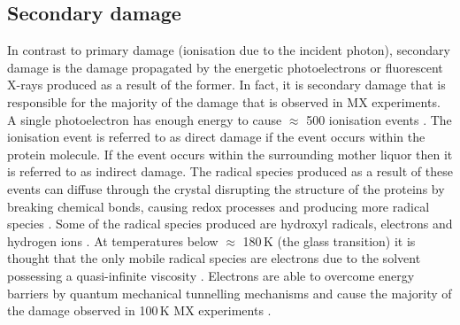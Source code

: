     \subsection{Secondary damage}
    \label{sub:Secondary damage}
        In contrast to primary damage (ionisation due to the incident photon), secondary damage is the damage propagated by the energetic photoelectrons or fluorescent X-rays produced as a result of the former.
        In fact, it is secondary damage that is responsible for the majority of the damage that is observed in MX experiments.
        A single photoelectron has enough energy to cause $\approx$ 500 ionisation events \cite{o2002physical}. The ionisation event is referred to as direct damage if the event occurs within the protein molecule.
        If the event occurs within the surrounding mother liquor then it is referred to as indirect damage.
        The radical species produced as a result of these events can diffuse through the crystal disrupting the structure of the proteins by breaking chemical bonds, causing redox processes and producing more radical species \cite{meents2010}.
		Some of the radical species produced are hydroxyl radicals, electrons and hydrogen ions \cite{garman2010}.
        At temperatures below $\approx$ 180\,K (the glass transition) it is thought that the only mobile radical species are electrons \cite{jones1987structure} due to the solvent possessing a quasi-infinite viscosity \cite{weik2001specific}.
		Electrons are able to overcome energy barriers by quantum mechanical tunnelling mechanisms \cite{garman2009radiation} and cause the majority of the damage observed in 100\,K MX experiments \cite{garman2010}.

